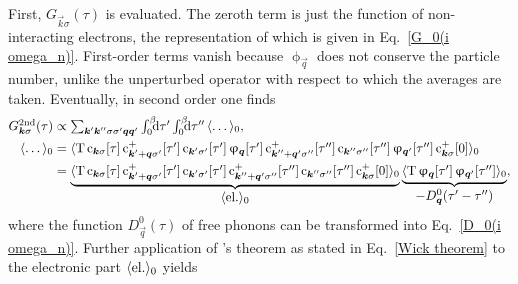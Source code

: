 First, $G_{\vec k \sigma}(\tau)$ is evaluated. The zeroth term is just the
 function of non-interacting electrons, the 
representation of which is given in Eq.~\ref{G_0(i omega_n)}. First-order terms
vanish because $\upphi_{\vec q}$ does not conserve the particle number, unlike
the unperturbed  operator with respect to which the averages are
taken. Eventually, in second order one finds
%
\begin{align} \label{Holstein 2nd}
    G \super{2nd}_{\vec k \sigma}(\tau) &\propto
    \sum_{\vec k' \vec k'' \sigma \sigma' \vec q \vec q'}
    \int \from 0 \till \beta \D \tau' \int \from 0 \till \beta \D \tau'' \,
    \av \dots_0,
    \\ \notag
    \av \dots_0 &= \av{\op T \,
        \op c_{\vec k \sigma}[\tau] \,
        \op c_{\vec k' + \vec q \sigma'}^+[\tau'] \,
        \op c_{\vec k' \sigma'}[\tau'] \,
        \upphi_{\vec q}[\tau'] \,
        \op c_{\vec k'' + \vec q' \sigma''}^+[\tau''] \,
        \op c_{\vec k'' \sigma''}[\tau''] \,
        \upphi_{\vec q'}[\tau''] \,
        \op c_{\vec k \sigma}^+[0]}_0
    \\ \notag
    &= \underbrace{
            \av{\op T \,
                \op c_{\vec k \sigma}[\tau] \,
                \op c_{\vec k' + \vec q \sigma'}^+[\tau'] \,
                \op c_{\vec k' \sigma'}[\tau'] \,
                \op c_{\vec k'' + \vec q' \sigma''}^+[\tau''] \,
                \op c_{\vec k'' \sigma''}[\tau''] \,
                \op c_{\vec k \sigma}^+[0]}_0
            }_{\displaystyle \av{\text{el.}}_0}
        \underbrace{
            \av{\op T \,
                \upphi_{\vec q}[\tau'] \,
                \upphi_{\vec q'}[\tau'']}_0
            }_{\displaystyle -D^0_{\vec q}(\tau' - \tau'')},
\end{align}
%
where the  function $D^0_{\vec q}(\tau)$ of free phonons can be
transformed into Eq.~\ref{D_0(i omega_n)}. Further application of 's
theorem as stated in Eq.~\ref{Wick theorem} to the electronic part
$\langle\text{el.}\rangle_0$ yields
%
\begingroup
    \def\minalignsep{0pt}
